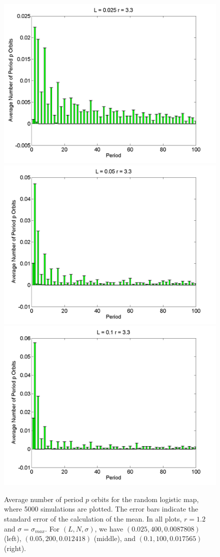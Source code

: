 \begin{figure}[H]\linespread{1}
\caption[Average number of period $p$ orbits for the random logistic
map, $\sigma=\sigma_{max}$ and $r=3.3$]{Average number of period $p$ orbits for the random logistic
map, where 5000 simulations are plotted. The error bars indicate
the standard error of the calculation of the mean. In all plots,
$r=1.2$ and $\sigma=\sigma_{max}$. For $(L,N,\sigma)$,
we have $(0.025, 400, 0.0087808)$ (left), $(0.05, 200, 0.012418)$
(middle), and $(0.1, 100, 0.017565)$ (right).}\label{fig:rloghist}
	\begin{center}
\includegraphics[width=.33\textwidth]{figs/rlog_hist_L_0025_r_33_s_00087808_a_96372e-07_sims_5000.png}\hfill		\includegraphics[width=.33\textwidth]{figs/rlog_hist_L_005_r_33_s_0012418_a_38546e-06_sims_5000.png}\hfill
\includegraphics[width=.33\textwidth]{figs/rlog_hist_L_01_r_33_s_0017565_a_15414e-05_sims_5000.png}
	\end{center}
\end{figure}

